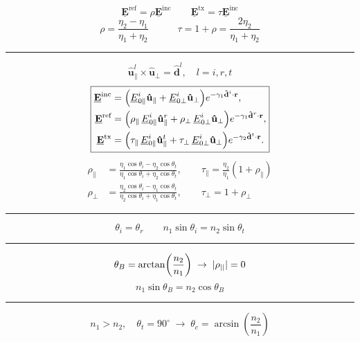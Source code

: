 \begin{myframe}
    $$
        \mathbf{\underline{E}}^{\text{ref}} = \rho \mathbf{\underline{E}}^{\text{inc}}
        \qquad
        \mathbf{\underline{E}}^{\text{tx}} = \tau \mathbf{\underline{E}}^{\text{inc}}
    $$
    $$
        \rho = \frac{\eta_2 - \eta_1}{\eta_1 + \eta_2}
        \qquad\quad
        \tau = 1 + \rho = \frac{2\eta_2}{\eta_1 + \eta_2}
    $$
    \hrule\vskip 2mm
    $$
        \mathbf{\hat{u}}^{l}_{\parallel} \times \mathbf{\hat{u}}_{\perp} = \mathbf{\hat{d}}^{l}, \quad
        l = i, r, t
    $$
    $$
    \boxed{%
        \begin{aligned}
            \mathbf{\underline{E}}^{\text{inc}} &= \left( \underline{E}_{0\parallel}^i \mathbf{\hat{u}}_{\parallel} + \underline{E}_{0\perp}^i \mathbf{\hat{u}}_{\perp} \right) e^{-\gamma_1 \mathbf{\hat{d}}^i \cdot \mathbf{r}}, \\
            \mathbf{\underline{E}}^{\text{ref}} &= \left( \rho_{\parallel}\, \underline{E}_{0\parallel}^i \mathbf{\hat{u}}^{r}_{\parallel} + \rho_{\perp}\, \underline{E}_{0\perp}^i \mathbf{\hat{u}}_{\perp} \right) e^{-\gamma_1 \mathbf{\hat{d}}^r \cdot \mathbf{r}}, \\
            \mathbf{\underline{E}}^{\text{tx}} &= \left( \tau_{\parallel}\, \underline{E}_{0\parallel}^i \mathbf{\hat{u}}^{t}_{\parallel} + \tau_{\perp}\, \underline{E}_{0\perp}^i \mathbf{\hat{u}}_{\perp} \right) e^{-\gamma_2 \mathbf{\hat{d}}^t \cdot \mathbf{r}}.
        \end{aligned}
    }
    $$
    $$
    \begin{aligned}
        \rho_{\parallel} &= \frac{\eta_1 \cos \theta_i - \eta_2 \cos \theta_t}{\eta_1 \cos \theta_i + \eta_2 \cos \theta_t},
        \qquad
        \tau_{\parallel} = \frac{\eta_2}{\eta_1} (1 + \rho_{\parallel})\\
        \rho_{\perp} &= \frac{\eta_2 \cos \theta_i - \eta_1 \cos \theta_t}{\eta_2 \cos \theta_i + \eta_1 \cos \theta_t},\qquad
        \tau_{\perp} = 1 + \rho_{\perp}
    \end{aligned}
    $$

    \hrule\vskip 2mm
    $$
        \theta_i = \theta_r
        \qquad
        n_1 \sin \theta_i = n_2 \sin \theta_t
    $$
    \hrule\vskip 2mm
    $$
        \theta_B = \arctan\left( \frac{n_2}{n_1} \right)\;\rightarrow\;\abs{\rho_{||}} = 0
    $$
    $$
        n_1 \sin \theta_B = n_2 \cos \theta_B
    $$
    \hrule\vskip 2mm
    $$
        n_1 > n_2,\quad \theta_t = 90^\circ\;\rightarrow\;\theta_c = \arcsin\left( \frac{n_2}{n_1} \right)
    $$
\end{myframe}
